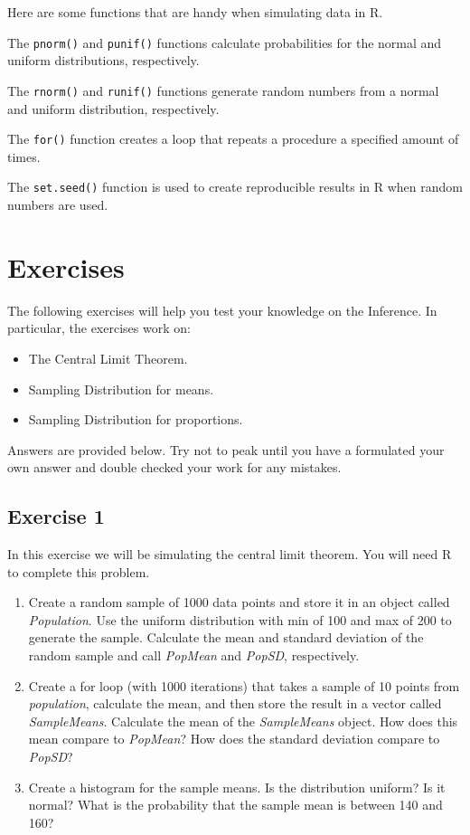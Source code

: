 \documentclass[
  letterpaper,
  DIV=11,
  numbers=noendperiod]{scrreprt}
\providecommand{\tightlist}{%
  \setlength{\itemsep}{0pt}\setlength{\parskip}{0pt}}\usepackage{longtable,booktabs,array}
\begin{document}
Here are some functions that are handy when simulating data in R.

The \texttt{pnorm()} and \texttt{punif()} functions calculate
probabilities for the normal and uniform distributions, respectively.

The \texttt{rnorm()} and \texttt{runif()} functions generate random
numbers from a normal and uniform distribution, respectively.

The \texttt{for()} function creates a loop that repeats a procedure a
specified amount of times.

The \texttt{set.seed()} function is used to create reproducible results
in R when random numbers are used.

\hypertarget{exercises-10}{%
\section{Exercises}\label{exercises-10}}

The following exercises will help you test your knowledge on the
Inference. In particular, the exercises work on:

\begin{itemize}
\item
  The Central Limit Theorem.
\item
  Sampling Distribution for means.
\item
  Sampling Distribution for proportions.
\end{itemize}

Answers are provided below. Try not to peak until you have a formulated
your own answer and double checked your work for any mistakes.

\hypertarget{exercise-1-20}{%
\subsection*{Exercise 1}\label{exercise-1-20}}

In this exercise we will be simulating the central limit theorem. You
will need R to complete this problem.

\begin{enumerate}
\def\labelenumi{\arabic{enumi}.}
\tightlist
\item
  Create a random sample of 1000 data points and store it in an object
  called \emph{Population}. Use the uniform distribution with min of 100
  and max of 200 to generate the sample. Calculate the mean and standard
  deviation of the random sample and call \emph{PopMean} and
  \emph{PopSD}, respectively.
\item
  Create a for loop (with 1000 iterations) that takes a sample of 10
  points from \emph{population}, calculate the mean, and then store the
  result in a vector called \emph{SampleMeans}. Calculate the mean of
  the \emph{SampleMeans} object. How does this mean compare to
  \emph{PopMean}? How does the standard deviation compare to
  \emph{PopSD}?
\item
  Create a histogram for the sample means. Is the distribution uniform?
  Is it normal? What is the probability that the sample mean is between
  140 and 160?
\end{enumerate}
\end{document}
